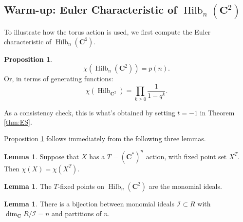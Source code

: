 \documentclass{amsart}[12pt]
\theoremstyle{definition}
\newtheorem{lemma}[dummy]{Lemma}
\newtheorem{proposition}[dummy]{Proposition}
\newcommand{\C}{\mathbf{C}}
\newcommand{\II}{\mathcal{I}}
\DeclareMathOperator{\Hilb}{Hilb}
\begin{document}
\subsection{Warm-up: Euler Characteristic of $\Hilb_n(\C^2)$} \label{sec:Teuler}

To illustrate how the torus action is used, we first compute the Euler characteristic of $\Hilb_n(\C^2)$.




\begin{proposition} \label{prop:hilbchi}
$$\chi(\Hilb_n(\C^2))=p(n).$$
Or, in terms of generating functions:
$$\chi(\Hilb_{\C^2})=\prod_{k\geq 0} \frac{1}{1-q^k}.$$
\end{proposition}

As a consistency check, this is what's obtained by setting $t=-1$ in Theorem \ref{thm:ES}.


Proposition \ref{prop:hilbchi} follows immediately from the following three lemmas.

\begin{lemma} \label{lem:toruschi}
Suppose that $X$ has a $T=(\C^*)^n$ action, with fixed point set $X^T$.  Then $\chi(X)=\chi(X^T)$.
\end{lemma}

\begin{lemma} \label{lem:Tmonomials}
The $T$-fixed points on $\Hilb_n(\C^2)$ are the monomial ideals.
\end{lemma}

\begin{lemma} \label{lem:monomialspartitions}
There is a bijection between monomial ideals $\II\subset R$ with $\dim_\C R/\II=n$ and partitions of $n$.
\end{lemma}
\end{document}
